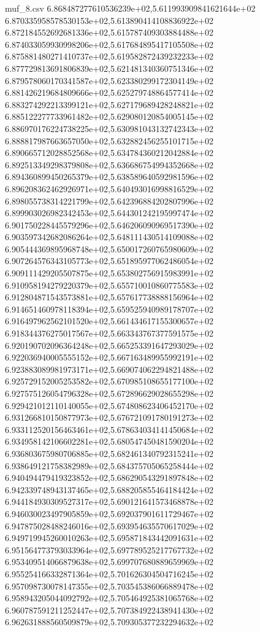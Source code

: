 \begin{filecontents*}{muf_8.csv}
6.868487277610536239e+02,5.611993909841621644e+02
6.870335958578530153e+02,5.613890414108836922e+02
6.872184552692681336e+02,5.615787409303884488e+02
6.874033059930998206e+02,5.617684895417105508e+02
6.875881480271410737e+02,5.619582872439232233e+02
6.877729813691806839e+02,5.621481340360751346e+02
6.879578060170341587e+02,5.623380299172304149e+02
6.881426219684809666e+02,5.625279748864577414e+02
6.883274292213399121e+02,5.627179689428248821e+02
6.885122277733961482e+02,5.629080120854005145e+02
6.886970176224738225e+02,5.630981043132742343e+02
6.888817987663657050e+02,5.632882456255101715e+02
6.890665712028852568e+02,5.634784360212042884e+02
6.892513349298379808e+02,5.636686754994352668e+02
6.894360899450265379e+02,5.638589640592981596e+02
6.896208362462926971e+02,5.640493016998816529e+02
6.898055738314221799e+02,5.642396884202807996e+02
6.899903026982342453e+02,5.644301242195997474e+02
6.901750228445579296e+02,5.646206090969517390e+02
6.903597342682086264e+02,5.648111430514109088e+02
6.905444369895968748e+02,5.650017260765980609e+02
6.907264576343105773e+02,5.651895977062486054e+02
6.909111429205507875e+02,5.653802756915983991e+02
6.910958194279220379e+02,5.655710010860775583e+02
6.912804871543573881e+02,5.657617738888156964e+02
6.914651460978118394e+02,5.659525940989178707e+02
6.916497962562101520e+02,5.661434617155300657e+02
6.918344376275017567e+02,5.663343767377591575e+02
6.920190702096364248e+02,5.665253391647293029e+02
6.922036940005555152e+02,5.667163489955992191e+02
6.923883089981973171e+02,5.669074062294821488e+02
6.925729152005253582e+02,5.670985108655177100e+02
6.927575126054796328e+02,5.672896629028655298e+02
6.929421012110140055e+02,5.674808623406452170e+02
6.931266810150877973e+02,5.676721091780191273e+02
6.933112520156463461e+02,5.678634034141450684e+02
6.934958142106602281e+02,5.680547450481590204e+02
6.936803675980706885e+02,5.682461340792315241e+02
6.938649121758382989e+02,5.684375705065258444e+02
6.940494479419323852e+02,5.686290543291897848e+02
6.942339748943137465e+02,5.688205855464184424e+02
6.944184930309527317e+02,5.690121641573468878e+02
6.946030023497905859e+02,5.692037901611729467e+02
6.947875028488246016e+02,5.693954635570617029e+02
6.949719945260010263e+02,5.695871843442091631e+02
6.951564773793033964e+02,5.697789525217767732e+02
6.953409514066879638e+02,5.699707680889659969e+02
6.955254166332871364e+02,5.701626304504716245e+02
6.957098730078147355e+02,5.703545386066889478e+02
6.958943205044092792e+02,5.705464925381065768e+02
6.960787591211252447e+02,5.707384922438941430e+02
6.962631888560509879e+02,5.709305377232294632e+02

\end{filecontents*}
